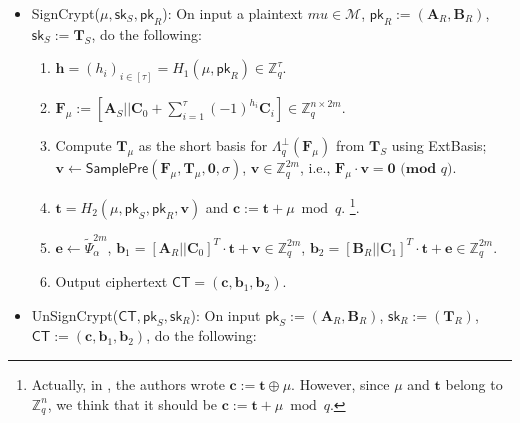 \documentclass[a4paper,11pt,onecolumn]{elsarticle}
\begin{document}
\begin{itemize}
	\item \textsf{SignCrypt}($ \mu, \mathsf{sk}_S, \mathsf{pk}_R$): On input  a plaintext $mu \in \mathcal{M}$,  $\mathsf{pk}_R:=(\mathbf{A}_R, \mathbf{B}_R)$, $\mathsf{sk}_S:=\mathbf{T}_S$, do the following:
	
				
				\begin{enumerate}
					\item   $\mathbf{h}=(h_i)_{i\in[\tau]}=H_	1(\mu,\mathsf{pk}_R) \in \mathbb{Z}_q^{\tau}$.
				\item $\mathbf{F}_{\mu}:=[\mathbf{A}_S|| \mathbf{C}_0+\sum_{i=1}^{\tau} (-1)^{h_i}\mathbf{C}_i] \in \mathbb{Z}_q^{n \times 2m}$.
				\item Compute $\mathbf{T}_{\mu}$ as the short basis for $\Lambda_q^{\bot}(\mathbf{F}_{\mu})$ from $\mathbf{T}_{S}$ using \textsf{ExtBasis}; $\mathbf{v}\leftarrow \textsf{SamplePre}(\mathbf{F}_{\mu}, \mathbf{T}_{\mu}, \mathbf{0},\sigma)$, $\mathbf{v}\in \mathbb{Z}_q^{2m}$, i.e., $\mathbf{F}_{\mu}\cdot \mathbf{v}=\mathbf{0} \textbf{ (mod } q)$.
				\item
				$\mathbf{t}=H_2(\mu, \textsf{pk}_S, \textsf{pk}_R, \mathbf{v})$ and $\mathbf{c}:=\mathbf{t}+\mu \bmod q$. \footnote{Actually, in \cite{LWJ+14}, the authors wrote $\mathbf{c}:=\mathbf{t}\oplus \mu$. However, since $\mu$ and $\mathbf{t}$ belong to $\mathbb{Z}_q^n$, we think that it should be $\mathbf{c}:=\mathbf{t} + \mu \bmod q$. }.
				
				\item $\mathbf{e} \leftarrow \widetilde{\Psi}_{\alpha}^{2m}$, $\mathbf{b}_1=[\mathbf{A}_R||\mathbf{C}_0]^{T}\cdot \mathbf{t}+\mathbf{v}\in \mathbb{Z}_q^{ 2m}$, $\mathbf{b}_2=[\mathbf{B}_R||\mathbf{C}_1]^{T}\cdot \mathbf{t}+\mathbf{e} \in \mathbb{Z}_q^{2m}$.
				
				
				\item Output ciphertext $\mathsf{CT}=(\mathbf{c}, \mathbf{b}_1, \mathbf{b}_2)$.
				\end{enumerate}
	
		
		
	\item \textsf{UnSignCrypt}($ \textsf{CT}, \mathsf{pk}_S,\mathsf{sk}_R$): On input $ \mathsf{pk}_S:=(\mathbf{A}_R, \mathbf{B}_R)$, $\mathsf{sk}_R:=(\textbf{T}_{R})$, $\textsf{CT}:=(\mathbf{c}, \mathbf{b}_1, \mathbf{b}_2)$, do the following:
			\begin{enumerate}
	

\end{enumerate}
\end{itemize}
\end{document}
